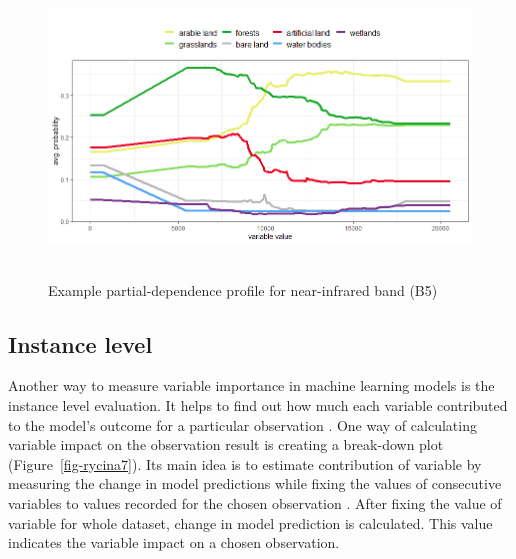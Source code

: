 \documentclass{amuthesis}
\begin{document}
\begin{figure}[H]

{\centering \includegraphics[width=5.625in,height=3.125in]{./figures/profB5.png}

}

\caption{\label{fig-rycina6}Example partial-dependence profile for
near-infrared band (B5)}

\end{figure}

\hypertarget{sec-importance-instance}{%
\subsection{Instance level}\label{sec-importance-instance}}

Another way to measure variable importance in machine learning models is
the instance level evaluation. It helps to find out how much each
variable contributed to the model's outcome for a particular observation
\autocite{biecek_explanatory_2021}. One way of calculating variable
impact on the observation result is creating a break-down plot
(Figure~\ref{fig-rycina7}). Its main idea is to estimate contribution of
variable by measuring the change in model predictions while fixing the
values of consecutive variables to values recorded for the chosen
observation \autocite{biecek_explanatory_2021}. After fixing the value
of variable for whole dataset, change in model prediction is calculated.
This value indicates the variable impact on a chosen observation.
\end{document}
